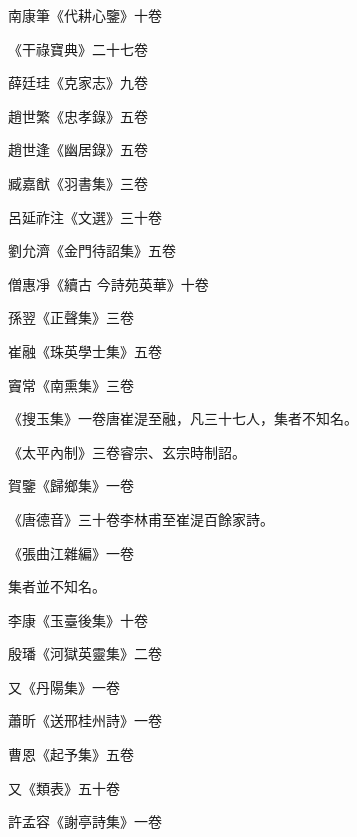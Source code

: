 \begin{pinyinscope}
 南康筆《代耕心鑒》十卷



 《干祿寶典》二十七卷



 薛廷珪《克家志》九卷



 趙世繁《忠孝錄》五卷



 趙世逢《幽居錄》五卷



 臧嘉猷《羽書集》三卷



 呂延祚注《文選》三十卷



 劉允濟《金門待詔集》五卷



 僧惠凈《續古
 今詩苑英華》十卷



 孫翌《正聲集》三卷



 崔融《珠英學士集》五卷



 竇常《南熏集》三卷



 《搜玉集》一卷唐崔湜至融，凡三十七人，集者不知名。



 《太平內制》三卷睿宗、玄宗時制詔。



 賀鑒《歸鄉集》一卷



 《唐德音》三十卷李林甫至崔湜百餘家詩。



 《張曲江雜編》一卷



 集者並不知名。



 李康《玉臺後集》十卷



 殷璠《河獄英靈集》二卷



 又《丹陽集》一卷



 蕭昕《送邢桂州詩》一卷



 曹恩《起予集》五卷



 又《類表》五十卷



 許孟容《謝亭詩集》一卷




\end{pinyinscope}
